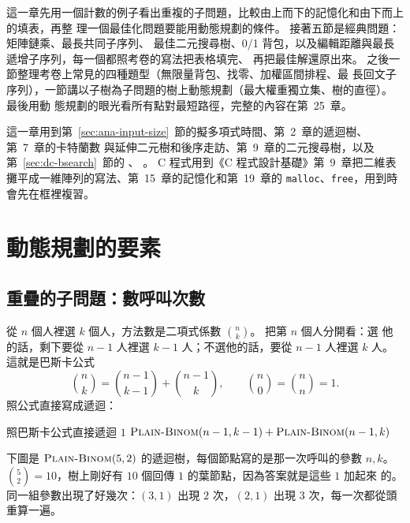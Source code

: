 這一章先用一個計數的例子看出重複的子問題，比較由上而下的記憶化和由下而上的填表，再整
理一個最佳化問題要能用動態規劃的條件。 接著五節是經典問題：矩陣鏈乘、最長共同子序列、
最佳二元搜尋樹、0/1 背包，以及編輯距離與最長遞增子序列，每一個都照考卷的寫法把表格填完、
再把最佳解還原出來。 之後一節整理考卷上常見的四種題型（無限量背包、找零、加權區間排程、最
長回文子序列），一節講以子樹為子問題的樹上動態規劃（最大權重獨立集、樹的直徑）。 最後用動
態規劃的眼光看所有點對最短路徑，完整的內容在第~25~章。

這一章用到第~\ref{sec:ana-input-size}~節的擬多項式時間、第~2~章的遞迴樹、第~7~章的卡特蘭數
與延伸二元樹和後序走訪、第~9~章的二元搜尋樹，以及第~\ref{sec:dc-bsearch}~節的 、
。 C 程式用到《C
程式設計基礎》第~9~章把二維表攤平成一維陣列的寫法、第~15~章的記憶化和第~19~章的
\texttt{malloc}、\texttt{free}，用到時會先在框裡複習。

\section{動態規劃的要素}
\label{sec:dp-elements}

\subsection{重疊的子問題：數呼叫次數}
\label{sec:dp-overlap}

從 $n$ 個人裡選 $k$ 個人，方法數是二項式係數 $\binom{n}{k}$。 把第 $n$ 個人分開看：選
他的話，剩下要從 $n - 1$ 人裡選 $k - 1$ 人；不選他的話，要從 $n - 1$ 人裡選 $k$ 人。
這就是巴斯卡公式
\[
\binom{n}{k} = \binom{n-1}{k-1} + \binom{n-1}{k}, \qquad
\binom{n}{0} = \binom{n}{n} = 1 .
\]
照公式直接寫成遞迴：

\begin{pseudo}[label=alg:dp-plain-binom]{照巴斯卡公式直接遞迴}
        \State \Return $1$
    \EndIf
    \State \Return $\Call{Plain-Binom}{n - 1, k - 1} + \Call{Plain-Binom}{n - 1, k}$
\EndFunction
\end{pseudo}

下圖是 $\proc{Plain-Binom}(5, 2)$ 的遞迴樹，每個節點寫的是那一次呼叫的參數 $n, k$。
$\binom{5}{2} = 10$，樹上剛好有 $10$ 個回傳 $1$ 的葉節點，因為答案就是這些 $1$ 加起來
的。 同一組參數出現了好幾次：$(3, 1)$ 出現 $2$ 次，$(2, 1)$ 出現 $3$ 次，每一次都從頭
重算一遍。

